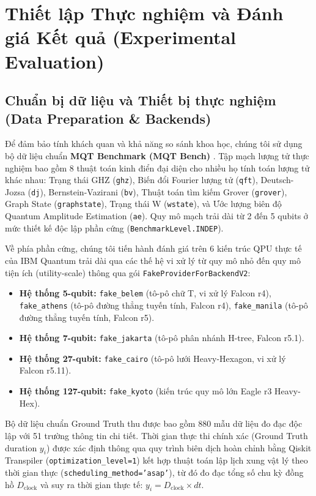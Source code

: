 \documentclass[11pt, a4paper]{article}
\begin{document}
\section{Thiết lập Thực nghiệm và Đánh giá Kết quả (Experimental Evaluation)}

\subsection{Chuẩn bị dữ liệu và Thiết bị thực nghiệm (Data Preparation \& Backends)}
Để đảm bảo tính khách quan và khả năng so sánh khoa học, chúng tôi sử dụng bộ dữ liệu chuẩn \textbf{MQT Benchmark (MQT Bench)} \cite{quetschlich2023mqt}. Tập mạch lượng tử thực nghiệm bao gồm 8 thuật toán kinh điển đại diện cho nhiều họ tính toán lượng tử khác nhau: Trạng thái GHZ (\texttt{ghz}), Biến đổi Fourier lượng tử (\texttt{qft}), Deutsch-Jozsa (\texttt{dj}), Bernstein-Vazirani (\texttt{bv}), Thuật toán tìm kiếm Grover (\texttt{grover}), Graph State (\texttt{graphstate}), Trạng thái W (\texttt{wstate}), và Ước lượng biên độ Quantum Amplitude Estimation (\texttt{ae}). Quy mô mạch trải dài từ 2 đến 5 qubits ở mức thiết kế độc lập phần cứng (\texttt{BenchmarkLevel.INDEP}).

Về phía phần cứng, chúng tôi tiến hành đánh giá trên 6 kiến trúc QPU thực tế của IBM Quantum trải dài qua các thế hệ vi xử lý từ quy mô nhỏ đến quy mô tiện ích (utility-scale) thông qua gói \texttt{FakeProviderForBackendV2}:
\begin{itemize}
    \item \textbf{Hệ thống 5-qubit:} \texttt{fake\_belem} (tô-pô chữ T, vi xử lý Falcon r4), \texttt{fake\_athens} (tô-pô đường thẳng tuyến tính, Falcon r4), \texttt{fake\_manila} (tô-pô đường thẳng tuyến tính, Falcon r5).
    \item \textbf{Hệ thống 7-qubit:} \texttt{fake\_jakarta} (tô-pô phân nhánh H-tree, Falcon r5.1).
    \item \textbf{Hệ thống 27-qubit:} \texttt{fake\_cairo} (tô-pô lưới Heavy-Hexagon, vi xử lý Falcon r5.11).
    \item \textbf{Hệ thống 127-qubit:} \texttt{fake\_kyoto} (kiến trúc quy mô lớn Eagle r3 Heavy-Hex).
\end{itemize}
Bộ dữ liệu chuẩn Ground Truth thu được bao gồm 880 mẫu dữ liệu đo đạc độc lập với 51 trường thông tin chi tiết. Thời gian thực thi chính xác (Ground Truth duration $y_i$) được xác định thông qua quy trình biên dịch hoàn chỉnh bằng Qiskit Transpiler (\texttt{optimization\_level=1}) kết hợp thuật toán lập lịch xung vật lý theo thời gian thực (\texttt{scheduling\_method='asap'}), từ đó đo đạc tổng số chu kỳ đồng hồ $D_{\text{clock}}$ và suy ra thời gian thực tế: $y_i = D_{\text{clock}} \times dt$.
\end{document}

